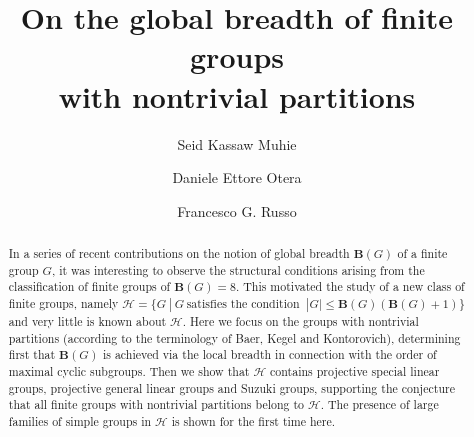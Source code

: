 \documentclass{amsart}
\theoremstyle{definition}
\numberwithin{equation}{section}
\begin{document}
\title[On the global breadth of finite groups with nontrivial partitions]{On the global breadth of finite groups\\ 
with nontrivial partitions}




\author[S.K. Muhie]{Seid Kassaw Muhie}
\address{Seid Kassaw Muhie \endgraf  
Institute of Data Science and Digital Technologies\endgraf 
 Vilnius University\endgraf
 Akademijos str. 4, LT-08663, Vilnius, Lithuania} %


\author[D.E. Otera]{Daniele Ettore Otera}
\address{Daniele Ettore Otera \endgraf  
Institute of Data Science and Digital Technologies\endgraf 
 Vilnius University\endgraf
 Akademijos str. 4, LT-08663, Vilnius, Lithuania} %


\author[F.G. Russo]{Francesco G. Russo}
\address{Francesco G. Russo \endgraf
School of Science and Technology\endgraf
University of Camerino\endgraf
via Madonna delle Carceri 9, Camerino, Italy\endgraf
and\endgraf
Department of Mathematics and Applied Mathematics\endgraf
University of the Western Cape\endgraf
Private Bag X17, 7535,  Bellville, South Africa}%







\begin{abstract} In a series of recent contributions on the notion of global breadth $\mathbf{B}(G)$ of a finite group $G$, it was interesting to observe  the structural conditions arising from the classification of finite groups of $\mathbf{B}(G)=8$. This  motivated the study of a new class of finite groups, namely  $\mathcal{H}=\{G \ | \ G \ \mbox{satisfies the condition } \ |G| \le \mathbf{B}(G)(\mathbf{B}(G) + 1)\}$ and very little is known about $\mathcal{H}$. Here we focus on the groups with nontrivial partitions (according to the terminology of Baer, Kegel and Kontorovich), determining first that  $\mathbf{B}(G)$ is achieved via the local breadth in connection with the order of maximal cyclic subgroups. Then  we show that $\mathcal{H}$ contains projective special linear groups, projective general linear groups and Suzuki groups, supporting the conjecture that all finite groups with nontrivial partitions belong to $\mathcal{H}$. The presence of large families of simple groups in $\mathcal{H}$ is shown  for the first time here.
\end{abstract}
\end{document}
